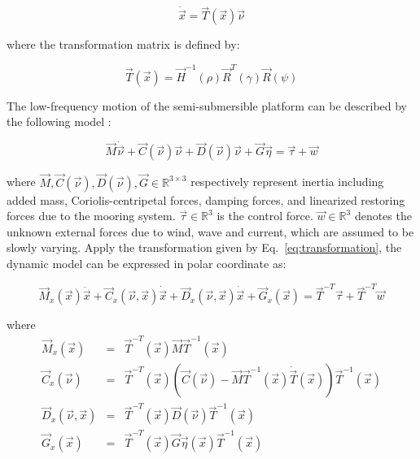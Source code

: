\begin{sloppypar}
\begin{equation} \label{eq:transformation}
\dot{\vec{x}} = \vec{T}(\vec{x})\vec{\nu}
\end{equation} 

\noindent where the transformation matrix is defined by:

\begin{equation}
\vec{T}(\vec{x}) = \vec{H}^{-1}(\rho)\vec{R}^T(\gamma)\vec{R}(\psi)
\end{equation}

The low-frequency motion of the semi-submersible platform can be described by the following model \cite{fossen2011handbook}:

\begin{equation}
\vec{M}\dot{\vec{\nu}} + \vec{C}(\vec{\nu})\vec{\nu} + \vec{D}(\vec{\nu})\vec{\nu} + \vec{G}\vec{\eta} = \vec{\tau} + \vec{w}
\end{equation}

\noindent where $\vec{M}, \vec{C}(\vec{\nu}), \vec{D}(\vec{\nu}), \vec{G}\in\mathbb{R}^{3\times3}$ respectively represent inertia including added mass, Coriolis-centripetal forces, damping forces, and linearized restoring forces due to the mooring system. $\vec{\tau}\in\mathbb{R}^3$ is the control force. $\vec{w}\in\mathbb{R}^3$ denotes the unknown external forces due to wind, wave and current, which are assumed to be slowly varying. Apply the transformation given by Eq.~\ref{eq:transformation}, the dynamic model can be expressed in polar coordinate as:

\begin{equation} \label{eq:control_plant}
\vec{M}_x(\vec{x})\ddot{\vec{x}} + \vec{C}_x(\vec{\nu}, \vec{x})\dot{\vec{x}} + \vec{D}_x(\vec{\nu}, \vec{x})\dot{\vec{x}} + \vec{G}_x(\vec{x}) = \vec{T}^{-T}\vec{\tau} + \vec{T}^{-T}\vec{w}
\end{equation}

\noindent where 
\begin{eqnarray}
\vec{M}_x(\vec{x}) &=& \vec{T}^{-T}(\vec{x})\vec{M}\vec{T}^{-1}(\vec{x}) \\
\vec{C}_x(\vec{\nu}) &=& \vec{T}^{-T}(\vec{x})\left( \vec{C}(\vec{\nu}) - \vec{M}\vec{T}^{-1}(\vec{x})\dot{\vec{T}}(\vec{x}) \right)\vec{T}^{-1}(\vec{x}) \\
\vec{D}_x(\vec{\nu}, \vec{x}) &=& \vec{T}^{-T}(\vec{x})\vec{D}(\vec{\nu})\vec{T}^{-1}(\vec{x}) \\
\vec{G}_x(\vec{x}) &=& \vec{T}^{-T}(\vec{x})\vec{G}\vec{\eta}(\vec{x})\vec{T}^{-1}(\vec{x})
\end{eqnarray}


\end{sloppypar}
